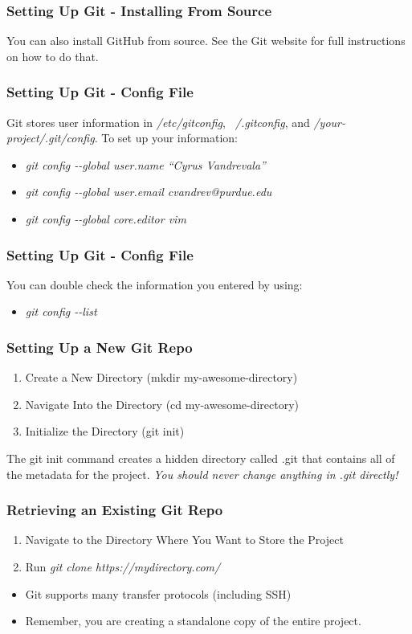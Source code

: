 \begin{frame}
\frametitle{\large{Setting Up Git - Installing From Source}}
You can also install GitHub from source. See the Git website for full instructions on how to do that.
\end{frame}

\begin{frame}
\frametitle{\large{Setting Up Git - Config File}}
Git stores user information in \emph{/etc/gitconfig}, \emph{~/.gitconfig}, and \emph{/your-project/.git/config}. To set up your information: \\
\begin{itemize}
\item \emph{git config -{}-global user.name ``Cyrus Vandrevala''}
\item \emph{git config -{}-global user.email cvandrev@purdue.edu}
\item \emph{git config -{}-global core.editor vim}
\end{itemize}
\end{frame}
\note{}

\begin{frame}
\frametitle{\large{Setting Up Git - Config File}}
You can double check the information you entered by using: \\
\begin{itemize}
\item \emph{git config -{}-list}
\end{itemize}
\end{frame}
\note{}

\begin{frame}
\frametitle{\large{Setting Up a New Git Repo}}
\begin{enumerate}
\item Create a New Directory (mkdir my-awesome-directory)
\item Navigate Into the Directory (cd my-awesome-directory)
\item Initialize the Directory (git init)
\end{enumerate}
\vspace{5mm}
The git init command creates a hidden directory called .git that contains all of the metadata for the project. \emph{You should never change anything in .git directly!}
\end{frame}
\note{}

\begin{frame}
\frametitle{\large{Retrieving an Existing Git Repo}}
\begin{enumerate}
\item Navigate to the Directory Where You Want to Store the Project
\item Run \emph{git clone https://mydirectory.com/}
\end{enumerate}
\vspace{5mm}
\begin{itemize}
\item Git supports many transfer protocols (including SSH)
\item Remember, you are creating a standalone copy of the entire project.
\end{itemize}
\end{frame}
\note{}